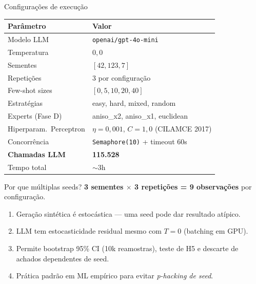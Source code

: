 \documentclass[aspectratio=169,10pt]{beamer}
\begin{document}
\begin{frame}{Configura\c{c}\~oes de execu\c{c}\~ao}
  \footnotesize
  \begin{center}
  \begin{tabular}{ll}
    \toprule
    \textbf{Par\^ametro} & \textbf{Valor} \\
    \midrule
    Modelo LLM & \texttt{openai/gpt-4o-mini} \\
    Temperatura & $0{,}0$ \\
    Sementes & $[42, 123, 7]$ \\
    Repeti\c{c}\~oes & 3 por configura\c{c}\~ao \\
    Few-shot sizes & $[0, 5, 10, 20, 40]$ \\
    Estrat\'egias & easy, hard, mixed, random \\
    Experts (Fase D) & aniso\_x2, aniso\_x1, euclidean \\
    Hiperparam.\ Perceptron & $\eta=0{,}001$, $C=1{,}0$ (CILAMCE 2017) \\
    Concorr\^encia & \texttt{Semaphore(10)} + timeout 60s \\
    \textbf{Chamadas LLM} & \textbf{115.528} \\
    Tempo total & $\sim$3h \\
    \bottomrule
  \end{tabular}
  \end{center}
\end{frame}

\begin{frame}{Por que m\'ultiplas seeds?}
  \footnotesize
  \textbf{3 sementes $\times$ 3 repeti\c{c}\~oes = 9 observa\c{c}\~oes} por configura\c{c}\~ao.
  \begin{enumerate}
    \item Gera\c{c}\~ao sint\'etica \'e estoc\'astica --- uma seed pode dar resultado at\'ipico.
    \item LLM tem estocasticidade residual mesmo com $T=0$ (batching em GPU).
    \item Permite bootstrap 95\% CI (10k reamostras), teste de H5 e descarte de achados dependentes de seed.
    \item Pr\'atica padr\~ao em ML emp\'irico para evitar \emph{p-hacking de seed}.
  \end{enumerate}
\end{frame}
\end{document}
